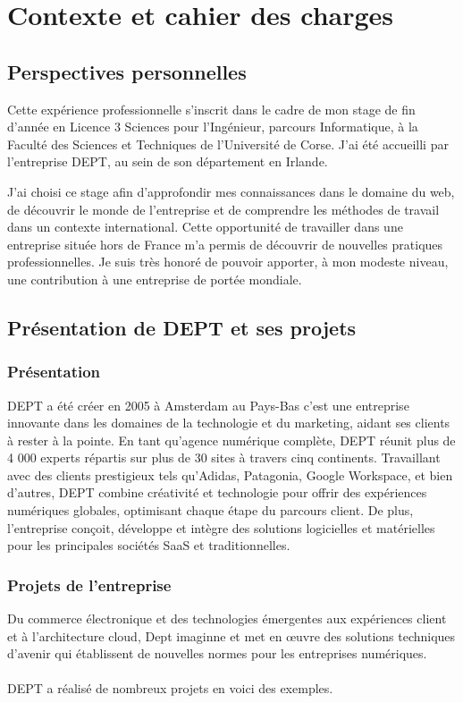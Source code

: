 \chapter{Contexte et cahier des charges}


\section{Perspectives personnelles}
Cette expérience professionnelle s'inscrit dans le cadre de mon stage de fin d'année en Licence 3 Sciences pour l'Ingénieur, parcours Informatique, à la Faculté des Sciences et Techniques de l'Université de Corse. J'ai été accueilli par l'entreprise DEPT, au sein de son département en Irlande.

J'ai choisi ce stage afin d'approfondir mes connaissances dans le domaine du web, de découvrir le monde de l'entreprise et de comprendre les méthodes de travail dans un contexte international. Cette opportunité de travailler dans une entreprise située hors de France m'a permis de découvrir de nouvelles pratiques professionnelles. Je suis très honoré de pouvoir apporter, à mon modeste niveau, une contribution à une entreprise de portée mondiale.


\section{Présentation de DEPT et ses projets}
\subsection{Présentation}
DEPT a été créer en 2005 à Amsterdam au Pays-Bas c'est une entreprise innovante dans les domaines de la technologie et du marketing, aidant ses clients à rester à la pointe. En tant qu'agence numérique complète, DEPT réunit plus de 4 000 experts répartis sur plus de 30 sites à travers cinq continents. Travaillant avec des clients prestigieux tels qu'Adidas, Patagonia, Google Workspace, et bien d'autres, DEPT combine créativité et technologie pour offrir des expériences numériques globales, optimisant chaque étape du parcours client. De plus, l'entreprise conçoit, développe et intègre des solutions logicielles et matérielles pour les principales sociétés SaaS et traditionnelles.

\subsection{Projets de l'entreprise}
Du commerce électronique et des technologies émergentes aux expériences client et à l'architecture cloud, Dept imaginne et met en œuvre des solutions techniques d'avenir qui établissent de nouvelles normes pour les entreprises numériques.
\\ \\
DEPT a réalisé de nombreux projets en voici des exemples.



